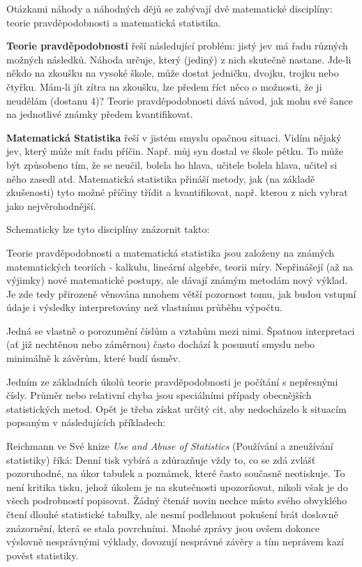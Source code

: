     Otázkami náhody a náhodných dějů se zabývají dvě matematické disciplíny: teorie pravděpodobnosti
    a matematická statistika.

    \textbf{Teorie pravděpodobnosti} řeší následující problém: jistý jev má řadu různých možných
    následků. Náhoda určuje, který (jediný) z nich skutečně nastane. Jde-li někdo na zkoušku na
    vysoké škole, může dostat jedničku, dvojku, trojku nebo čtyřku. Mám-li jít zítra na zkoušku, lze
    předem říct něco o možnosti, že ji neudělám (dostanu 4)? Teorie pravděpodobnosti dává návod, jak
    mohu své šance na jednotlivé známky předem kvantiﬁkovat.

    \textbf{Matematická Statistika} řeší v jistém smyslu opačnou situaci. Vidím nějaký jev, který
    může mít řadu příčin. Např. můj syn dostal ve škole pětku. To může být způsobeno tím, že se
    neučil, bolela ho hlava, učitele bolela hlava, učitel si něho zasedl atd. Matematická statistika
    přináší metody, jak (na základě zkušenosti) tyto možné příčiny třídit a kvantiﬁkovat, např.
    kterou z nich vybrat jako nejvěrohodnější.

    Schematicky lze tyto disciplíny znázornit takto:

    Teorie pravděpodobnosti a matematická statistika jsou založeny na známých matematických teoriích
    - kalkulu, lineární algebře, teorii míry. Nepřinášejí (až na výjimky) nové matematické postupy,
    ale dávají známým metodám nový výklad. Je zde tedy přirozeně věnována mnohem větší pozornost
    tomu, jak budou vstupní údaje i výsledky interpretovány než vlastnímu průběhu výpočtu.

    Jedná se vlastně o porozumění číslům a vztahům mezi nimi. Špatnou interpretaci (ať již nechtěnou
    nebo záměrnou) často dochází k posunutí smyslu nebo minimálně k závěrům, které budí úsměv. 

    Jedním ze základních úkolů teorie pravděpodobnosti je počítání s nepřesnými čísly. Průměr nebo
    relativní chyba jsou speciálními případy obecnějších statistických metod. Opět je třeba získat
    určitý cit, aby nedocházelo k situacím popsaným v následujících příkladech:

    

    Reichmann ve Své knize \emph{Use and Abuse of Statistics} (Používání a zneužívání statistiky)
    říká: Denní tisk vybírá a zdůrazňuje vždy to, co se zdá zvlášť pozoruhodné, na úkor tabulek a
    poznámek, které často současně neotiskuje. To není kritika tisku, jehož úkolem je na skutečnosti
    upozorňovat, nikoli však je do všech podrobností popisovat. Žádný čtenář novin nechce místo
    svého obvyklého čtení dlouhé statistické tabulky, ale nesmí podlehnout pokušení brát doslovně
    znázornění, která se stala povrchními. Mnohé zprávy jsou ovšem dokonce výslovně nesprávnými
    výklady, dovozují nesprávné závěry a tím neprávem kazí pověst statistiky.

